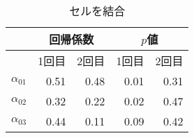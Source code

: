 \begin{table}[ht]
    \caption{セルを結合}
    \label{table:TABLE3}
    \centering
    \vspace{-0.3\baselineskip}
    \begin{tabular}{c|rr|rr}
        \hline
        &
        \multicolumn{2}{|c}{回帰係数} &
        \multicolumn{2}{|c}{$p$値} \\
        \hline
        & 1回目 & 2回目 & 1回目 & 2回目 \\
        \hline \hline
        $\alpha_{01}$ & 0.51 & 0.48 & 0.01 & 0.31 \\
        $\alpha_{02}$ & 0.32 & 0.22 & 0.02 & 0.47 \\
        $\alpha_{03}$ & 0.44 & 0.11 & 0.09 & 0.42 \\
        \hline
    \end{tabular}
\end{table}
